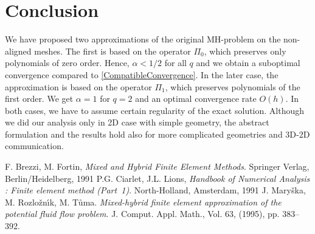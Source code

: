 \documentclass{Mamern09}
\begin{document}
\section{Conclusion}
We have proposed two approximations of the original MH-problem on the non-aligned meshes. 
The first is based
on the operator $\Pi_0$, which preserves only polynomials of zero order. Hence, $\alpha<1/2$ for all $q$ and we obtain a suboptimal convergence compared to \eqref{CompatibleConvergence}. In the later case, the approximation is based on the operator
$\Pi_1$, which preserves polynomials of the first order. We get $\alpha=1$ for $q=2$ and an optimal  convergence rate $O(h)$.
In both cases, we have to assume certain regularity of the exact solution. Although we did our analysis
only in 2D case with simple geometry, the abstract formulation and the results hold also for more complicated geometries and 3D-2D communication. 

\begin{thebibliography}{99}
 F. Brezzi, M. Fortin,
{\it Mixed and Hybrid Finite Element Methods}.
Springer Verlag, Berlin/Heidelberg, 1991
 P.G. Ciarlet, J.L. Lions,
{\it Handbook of Numerical Analysis : Finite element method (Part~1)}.
 North-Holland, Amsterdam, 1991
 J. Mary\v{s}ka,  M. Rozlo\v{z}n\'{\i}k, M. T\r{u}ma.
{\it Mixed-hybrid finite element approximation  of the potential fluid flow problem}.
J. Comput. Appl. Math., Vol. 63, (1995), pp. 383--392.

\end{thebibliography}
\end{document}
